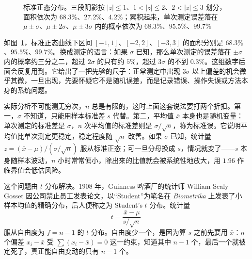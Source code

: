 \documentclass[UTF8]{ctexbook}
\begin{document}
\begin{figure}[H]
\caption{标准正态分布。三段阴影按 $|z|\le1$、$1<|z|\le2$、$2<|z|\le3$ 划分，面积依次为 $68.3\%$、$27.2\%$、$4.2\%$；累积起来，单次测定误差落在 $\mu\pm\sigma$、$\mu\pm2\sigma$、$\mu\pm3\sigma$ 内的概率依次为 $68.3\%$、$95.5\%$、$99.7\%$}
\label{fig:err-normal}
\end{figure}

如图~\ref{fig:err-normal}，标准正态曲线下区间 $[-1,1]$、$[-2,2]$、$[-3,3]$ 的面积分别是 $68.3\%$、$95.5\%$、$99.7\%$。换成测定的语言：如果 $\sigma$ 已知，那么单次测定的误差落在 $\pm\sigma$ 内的概率约三分之二，超过 $2\sigma$ 的只有约 $5\%$，超过 $3\sigma$ 的不到 $0.3\%$。这组数字后面会反复用到。它给出了一把先验的尺子：正常测定中出现 $3\sigma$ 以上偏差的机会微乎其微，一旦出现，先要怀疑它不是随机误差，而是记录错误、操作失误或方法本身的系统问题。

实际分析不可能测无穷次，$n$ 总是有限的，这时上面这套说法要打两个折扣。第一，$\sigma$ 不知道，只能用样本标准差 $s$ 代替。第二，平均值 $\bar{x}$ 本身也是随机变量：单次测定的标准差是 $\sigma$，$n$ 次平均值的标准差则是 $\sigma/\sqrt{n}$，称为标准误。它说明平均值比单次测定更稳定，稳定程度随 $\sqrt{n}$ 改善。如果 $\sigma$ 已知，统计量 $z=(\bar{x}-\mu)/(\sigma/\sqrt{n})$ 服从标准正态；可一旦分母换成 $s$，情况就变了——$s$ 本身随样本波动，$n$ 小时常常偏小，除出来的比值就会被系统性地放大，用 $1.96$ 作临界值会低估风险。

这个问题由 $t$ 分布解决。$1908$ 年，Guinness 啤酒厂的统计师 William Sealy Gosset 因公司禁止员工发表论文，以“Student”为笔名在 \emph{Biometrika} 上发表了小样本均值的精确分布，后人便称之为 Student's $t$ 分布。统计量
\[
t=\frac{\bar{x}-\mu}{s/\sqrt{n}}
\]
服从自由度为 $f=n-1$ 的 $t$ 分布。自由度少一个，是因为算 $s$ 之前先要用 $\bar{x}$：$n$ 个偏差 $x_i-\bar{x}$ 受 $\sum(x_i-\bar{x})=0$ 这一约束，知道其中 $n-1$ 个，最后一个就被定死了，真正能自由变动的只有 $n-1$ 个。
\end{document}
